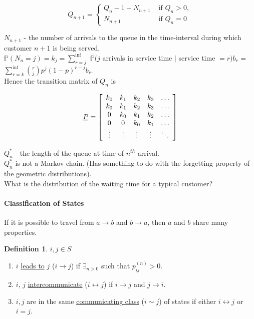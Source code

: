 \documentclass{article}
\theoremstyle{definition}
\newtheorem{defn}[thm]{Definition}
\newcommand{\PP}{\mathbb{P}}
\begin{document}
\[
Q_{n+1} = \begin{cases} Q_n - 1 + N_{n+1} & \mbox{ if } Q_n > 0,\\ N_{n+1} & \mbox{ if } Q_n = 0 \end{cases}
\]

$N_{n+1}$ - the number of arrivals to the queue in the time-interval during which customer $n+1$ is being served.\\

$\PP(N_n = j) = k_j = \sum_{r=j}^{\inf}$ $\PP(j$ arrivals in service time $\mid$ service time $= r)b_r$ = $\sum_{r=k}^{\inf} \binom{r}{j} p^j(1-p)^{r-j}b_r$.\\

Hence the transition matrix of $Q_n$ is

\[
\uuline{P} = \left [ \begin{array}{ccccc}
k_0 & k_1 & k_2 & k_3 & \hdots\\
k_0 & k_1 & k_2 & k_3 & \hdots\\
0 & k_0 & k_1 & k_2 & \hdots\\
0 & 0 & k_0 & k_1 & \hdots\\
\vdots & \vdots & \vdots & \vdots & \ddots\\
\end{array} \right ]
\]

$Q_n^{\ast}$ - the length of the queue at time of $n^{th}$ arrival.\\

$Q_n^{\ast}$ is not a Markov chain. (Has something to do with the forgetting property of the geometric distributions).\\

What is the distribution of the waiting time for a typical customer?

\paragraph*{Classification of States}

If it is possible to travel from $a \rightarrow b$ and $b \rightarrow a$, then $a$ and $b$ share many properties.

\begin{defn} $i,j \in S$
\begin{enumerate}
\item
$i$ \uline{leads to} $j$ ($i \rightarrow j$) if $\exists_{n>0}$ such that $p_{ij}^{(n)} > 0$.
\item
$i$, $j$ \uline{intercommunicate} ($i \leftrightarrow j$) if $i \rightarrow j$ and $j \rightarrow i$.
\item
$i, j$ are in the same \uline{communicating class} ($i \sim j$) of states if either $i \leftrightarrow j$ or $i = j$.
\end{enumerate}
\end{defn}
\end{document}
